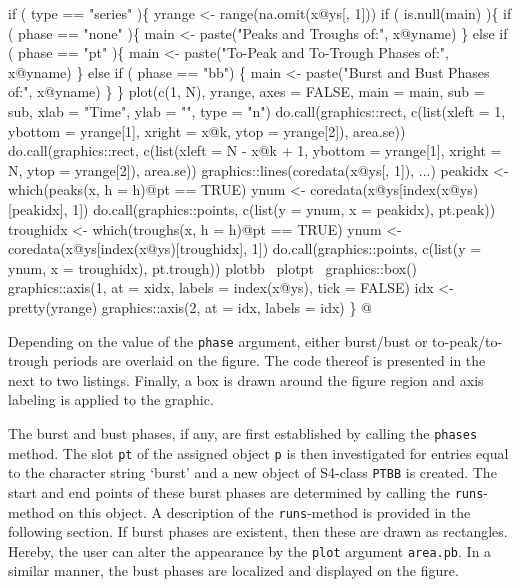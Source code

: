 \documentclass[a4paper]{article}
\begin{document}
\nwenddocs{}\endmoddef
if ( type == "series" )\{
    yrange <- range(na.omit(x@ys[, 1]))
    if ( is.null(main) )\{
        if ( phase == "none" )\{
            main <- paste("Peaks and Troughs of:", x@yname)
        \} else if ( phase == "pt" )\{
            main <- paste("To-Peak and To-Trough Phases of:", x@yname)
        \}
        else if ( phase == "bb") \{
            main <- paste("Burst and Bust Phases of:", x@yname)
        \}
    \}
    plot(c(1, N), yrange, axes = FALSE,
         main = main, sub = sub,
         xlab = "Time", ylab = "", type = "n")
    do.call(graphics::rect, c(list(xleft = 1,
                                   ybottom = yrange[1],
                                   xright = x@k,
                                   ytop = yrange[2]),
                              area.se))
    do.call(graphics::rect, c(list(xleft = N - x@k + 1,
                                   ybottom = yrange[1],
                                   xright = N,
                                   ytop = yrange[2]),
                              area.se))
    graphics::lines(coredata(x@ys[, 1]), ...)
    peakidx <- which(peaks(x, h = h)@pt == TRUE)
    ynum <- coredata(x@ys[index(x@ys)[peakidx], 1])
    do.call(graphics::points, c(list(y = ynum, x = peakidx),
                                pt.peak))
    troughidx <- which(troughs(x, h = h)@pt == TRUE)
    ynum <- coredata(x@ys[index(x@ys)[troughidx], 1])
    do.call(graphics::points, c(list(y = ynum, x = troughidx),
                                pt.trough))
    \LA{}plotbb~{\nwtagstyle{}}\RA{}
    \LA{}plotpt~{\nwtagstyle{}}\RA{}
    graphics::box()
    graphics::axis(1, at = xidx, labels = index(x@ys),
                   tick = FALSE)
    idx <- pretty(yrange)
    graphics::axis(2, at = idx, labels = idx)
\}
\nwendcode{}@

Depending on the value of the \verb?phase? argument, either burst/bust or
to-peak/to-trough periods are overlaid on the figure. The code
thereof is presented in the next to two listings. Finally, a box is
drawn around the figure region and axis labeling is applied to the
graphic.

The burst and bust phases, if any, are first established by calling
the \verb?phases? method. The slot \verb?pt? of the assigned object \verb?p? is
then investigated for entries equal to the character string
`burst' and a new object of S4-class \verb?PTBB? is created. The start
and end points of these burst phases are determined by calling the
\verb?runs?-method on this object. A description of the \verb?runs?-method
is provided in the following section. If burst phases are existent,
then these are drawn as rectangles. Hereby, the user can alter the
appearance by the \verb?plot? argument \verb?area.pb?. In a similar manner,
the bust phases are localized and displayed on the figure.
\end{document}
